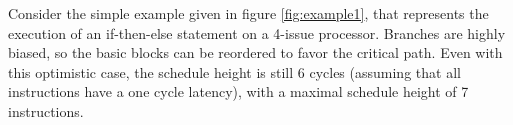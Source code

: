 Consider the simple example given in figure \ref{fig:example1}, that represents the execution of an if-then-else statement on a 4-issue processor. Branches are highly biased, so the basic blocks can be reordered to favor the critical path. Even with this optimistic case, the schedule height is still 6 cycles (assuming that all instructions have a one cycle latency), with a maximal schedule height of 7 instructions. 

\begin{figure}
\footnotesize


\end{figure}
